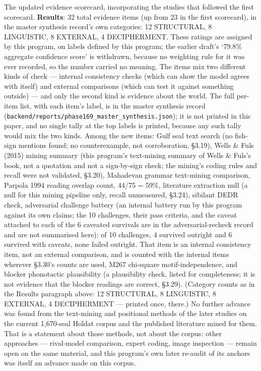 \documentclass[11pt]{article}
\newcounter{none} %
\begin{document}
The updated evidence scorecard, incorporating the studies that followed the first scorecard.
\textbf{Results}: 32 total evidence items (up from 23 in the first scorecard), in the master synthesis record's own categories: 12 STRUCTURAL, 8 LINGUISTIC, 8 EXTERNAL, 4 DECIPHERMENT. These ratings are assigned by this program, on labels defined by this program; the earlier draft's `79.8\% aggregate confidence score' is withdrawn, because no weighting rule for it was ever recorded, so the number carried no meaning. The items mix two different kinds of check --- internal consistency checks (which can show the model agrees with itself) and external comparisons (which can test it against something outside) --- and only the second kind is evidence about the world. The full per-item list, with each item's label, is in the master synthesis record (\texttt{backend/reports/phase169\_master\_synthesis.json}); it is not printed in this paper, and no single tally at the top labels is printed, because any such tally would mix the two kinds. Among the new items: Gulf seal text search (no fish-sign mentions found; no counterexample, not corroboration, §3.19), Wells \& Fuls (2015) mining summary (this program's text-mining summary of Wells \& Fuls's book, not a quotation and not a sign-by-sign check; the mining's coding rules and recall were not validated, §3.20), Mahadevan grammar text-mining comparison, Parpola 1994 reading overlap count, 44/75 = 59\%, literature extraction null (a null for this mining pipeline only, recall unmeasured, §3.24), sibilant DEDR check, adversarial challenge battery (an internal battery run by this program against its own claims; the 10 challenges, their pass criteria, and the caveat attached to each of the 6 caveated survivals are in the adversarial-recheck record and are not summarised here): of 10 challenges, 4 survived outright and 6 survived with caveats, none failed outright. That item is an internal consistency item, not an external comparison, and is counted with the internal items wherever §3.30's counts are used, M267 chi-square motif-independence, and blocker phonotactic plausibility (a plausibility check, listed for completeness; it is not evidence that the blocker readings are correct, §3.29). (Category counts as in the Results paragraph above: 12 STRUCTURAL, 8 LINGUISTIC, 8 EXTERNAL, 4 DECIPHERMENT --- printed once, there.)
No further advance was found from the text-mining and positional methods of the later studies on the current 1,670-seal Holdat corpus and the published literature mined for them. That is a statement about those methods, not about the corpus: other approaches --- rival-model comparison, expert coding, image inspection --- remain open on the same material, and this program's own later re-audit of its anchors was itself an advance made on this corpus.
\end{document}
